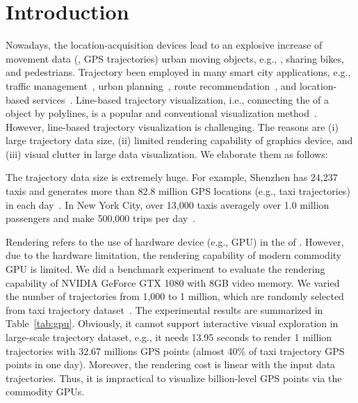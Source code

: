 \section{Introduction}\label{sec:intro}
Nowadays, the  location-acquisition devices lead to an explosive increase of movement data (, GPS trajectories)  urban moving objects, e.g., , sharing bikes, and pedestrians.
Trajectory  been employed in many smart city applications, e.g.,  traffic management~\cite{wang2014visual}, urban planning~\cite{tang2017efficient}, route recommendation~\cite{zheng2011learning}, and location-based services~\cite{liu2016smartadp, zheng2010collaborative}.
Line-based trajectory visualization, i.e., connecting the  of a  object by polylines, is a popular and conventional visualization method~\cite{chen2015survey}.
However,  line-based trajectory visualization is challenging.
The reasons are (i) large trajectory data size, (ii) limited rendering capability of graphics device, and (iii) visual clutter in large data visualization.
We elaborate them as follows:

 The trajectory data size is extremely huge.
For example, Shenzhen has 24,237 taxis and generates more than 82.8 million GPS locations (e.g., taxi trajectories) in each day~\cite{sz}. %
In New York City,  over 13,000 taxis  averagely  over 1.0 million passengers and make 500,000 trips per day~\cite{ferreira2013visual}.

Rendering refers to the use of hardware device (e.g., GPU) in the  of .
However, due to the hardware limitation, the rendering capability of modern commodity GPU is limited.
We did a benchmark experiment to evaluate the rendering capability of NVIDIA GeForce GTX 1080 with 8GB video memory.
We varied the number of trajectories from 1,000 to 1 million, which are randomly selected from \pt{} taxi trajectory dataset~\cite{pt}.%
 The experimental results are summarized in Table~\ref{tab:gpu}.
Obviously, it cannot support interactive visual exploration in large-scale trajectory dataset, e.g.,
it needs 13.95 seconds to render 1 million trajectories with 32.67 millions GPS points (almost 40\% of \sz{} taxi trajectory GPS points in one day).
Moreover, the rendering cost is linear with the input data trajectories.
Thus, it is impractical to visualize billion-level GPS points via the commodity GPUs.

